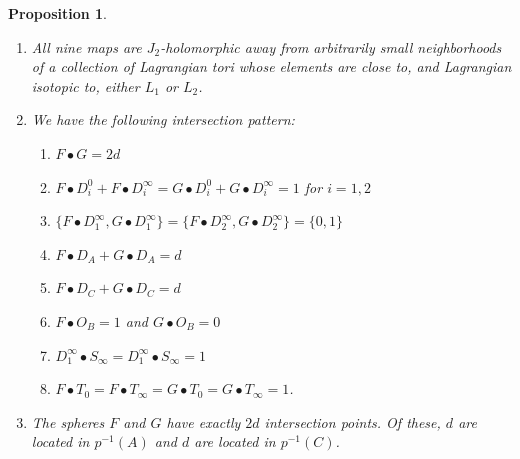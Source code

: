 \documentclass[12pt]{amsart}
\newtheorem{proposition}[theorem]{Proposition}
\theoremstyle{definition}
\begin{document}
\begin{proposition}
\begin{enumerate}
\item  All nine maps are $J_2$-holomorphic away from arbitrarily small neighborhoods of a collection of Lagrangian tori whose elements are close to, and Lagrangian isotopic to, either $L_1$ or $L_2$.\\

\item We have the following intersection pattern:\\
\begin{enumerate}
    \item $F \bullet G=2d$
    \item $F \bullet D^0_i + F \bullet D^\infty_i = G \bullet D^0_i + G \bullet D^\infty_i =1$ for $i=1,2$
    \item $\{F \bullet D^\infty_1, G \bullet D^\infty_1\} = \{F \bullet D^\infty_2, G \bullet D^\infty_2\} = \{0,1\}$    %
    \item $F \bullet D_A + G \bullet D_A = d$
    \item $F \bullet D_C + G \bullet D_C = d$
    \item $F \bullet O_B =1$ and $G \bullet O_B=0$
    \item $D^\infty_1 \bullet S_\infty = D^\infty_1 \bullet S_\infty =1$
    \item $F \bullet T_0 = F \bullet T_\infty=G \bullet T_0 = G \bullet T_\infty=1$.\\
\end{enumerate} 







\item The spheres $F$ and $G$ have exactly $2d$ intersection points. Of these, $d$ are located in $p^{-1}(A)$ and $d$ are located in $p^{-1}(C)$.\\

\end{enumerate} 



\end{proposition}
\end{document}
